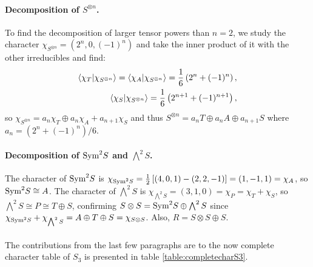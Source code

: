 \paragraph{Decomposition of $S^{\otimes n}$.}\cite[Exercise 2.7.]{FultonHarris} To find the decomposition of larger tensor powers than $n=2$, we study the character $\chi_{S^{\otimes n}} = (2^n, 0, (-1)^n)$ and take the inner product of it with the other irreducibles and find:
\begin{align}
	\bra{\chi_T}\ket{\chi_{S^{\otimes n}}} = \bra{\chi_A}\ket{\chi_{S^{\otimes n}}} = \frac{1}{6}\left(2^n + (-1)^n\right), \\
	\bra{\chi_S}\ket{\chi_{S^{\otimes n}}} = \frac{1}{6}\left(2^{n+1} + (-1)^{n+1}\right), 
\end{align}
so $\chi_{S^{\otimes n}} = a_n \chi_T \oplus a_n \chi_A + a_{n+1} \chi_S$ and thus $S^{\otimes n} = a_n T \oplus a_n A \oplus a_{n+1} S$ where $a_n = \left(2^n + (-1)^n\right)/6$.

\paragraph{Decomposition of $\text{Sym}^2S$ and $\bigwedge^2S$.} The character of $\text{Sym}^2S$ is $\chi_{\text{Sym}^2S} = \frac{1}{2}\left[ (4,0,1) - (2,2,-1) \right] = (1,-1,1) = \chi_A$, so $\text{Sym}^2S \cong A$. The character of $\bigwedge^2S$ is $\chi_{\bigwedge^2S} = (3,1,0) = \chi_P = \chi_T + \chi_S$, so $\bigwedge^2S \cong P \cong T \oplus S$, confirming $S \otimes S = \text{Sym}^2S \oplus \bigwedge^2S$ since $\chi_{\text{Sym}^2S} + \chi_{\bigwedge^2S} = A \oplus T \oplus S = \chi_{S \otimes S}$. Also, $R = S \otimes S \oplus S$.

\paragraph{} The contributions from the last few paragraphs are to the now complete character table of $S_3$ is presented in table \ref{table:completecharS3}.

